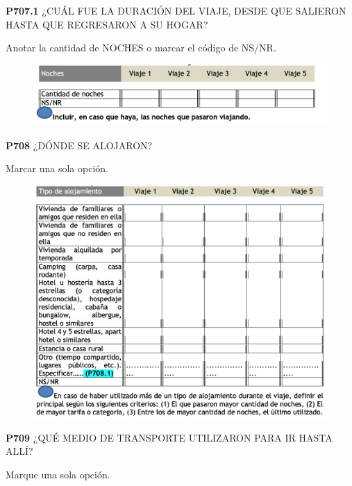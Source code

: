 \documentclass[
  openany]{book}
\begin{document}
\textbf{P707.1} ¿CUÁL FUE LA DURACIÓN DEL VIAJE, DESDE QUE SALIERON HASTA QUE REGRESARON A SU HOGAR?

Anotar la cantidad de NOCHES o marcar el código de NS/NR.

\begin{figure}

{\centering \includegraphics[width=1\linewidth]{imagenes/figura6-241} 

}

\end{figure}

\textbf{P708} ¿DÓNDE SE ALOJARON?

Marcar una sola opción.

\begin{figure}

{\centering \includegraphics[width=1\linewidth]{imagenes/figura6-242} 

}

\end{figure}

\textbf{P709} ¿QUÉ MEDIO DE TRANSPORTE UTILIZARON PARA IR HASTA ALLÍ?

Marque una sola opción.
\end{document}
